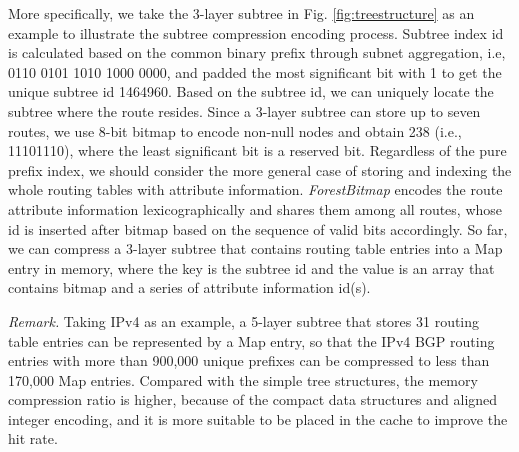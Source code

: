 More specifically, we take the 3-layer subtree in Fig. \ref{fig:treestructure} as an example to illustrate the subtree compression encoding process. Subtree index id is calculated based on the common binary prefix through subnet aggregation, i.e, 0110 0101 1010 1000 0000, and padded the most significant bit with 1 to get the unique subtree id 1464960. Based on the subtree id, we can uniquely locate the subtree where the route resides.  
Since a 3-layer subtree can store up to seven routes, we use 8-bit bitmap to encode non-null nodes and obtain 238 (i.e., 11101110), where the least significant bit is a reserved bit. Regardless of the pure prefix index, we should consider the more general case of storing and indexing the whole routing tables with attribute information. \emph{ForestBitmap} encodes  the route attribute information  lexicographically and shares them among all routes, whose id is inserted after bitmap based on the sequence of valid bits accordingly. So far, we can compress a 3-layer subtree that contains routing table entries into a Map entry in memory, where the key is the subtree id and the value is an array that contains bitmap and a series of attribute information id(s). 

\emph{Remark.} Taking IPv4 as an example, a 5-layer subtree that stores 31 routing table entries can be represented by a Map entry, so that the IPv4 BGP routing entries with more than 900,000 unique prefixes can be compressed to less than 170,000 Map entries. Compared with the simple tree structures, the memory compression ratio is higher, because of the  compact data structures and aligned integer encoding, and it is more suitable to be placed in the cache to improve the hit rate.

\begin{table}[tbp]
	\centering
	\vspace{-0.1in}
	\caption{\small Memory optimization of \emph{ForestBitmap}}
	\label{tab:compression-mem}
\end{table}

